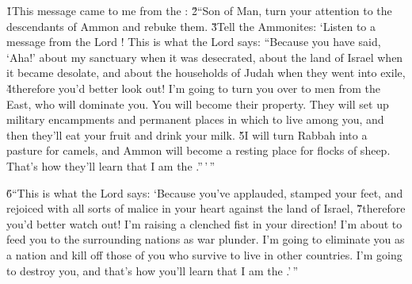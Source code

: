 \v{1}This message came to me from the : \v{2}``Son of Man, turn your attention to the descendants of Ammon and rebuke them. \v{3}Tell the Ammonites: `Listen to a message from the Lord ! This is what the Lord  says: ``Because you have said, `Aha!' about my sanctuary when it was desecrated, about the land of Israel when it became desolate, and about the households of Judah when they went into exile, \v{4}therefore you'd better look out! I'm going to turn you over to men from the East, who will dominate you. You will become their property. They will set up military encampments and permanent places in which to live among you, and then they'll eat your fruit and drink your milk. \v{5}I will turn Rabbah into a pasture for camels, and Ammon will become a resting place for flocks of sheep. That's how they'll learn that I am the .''\,'\,''

\v{6}``This is what the Lord  says: `Because you've applauded, stamped your feet, and rejoiced with all sorts of malice in your heart against the land of Israel, \v{7}therefore you'd better watch out! I'm raising a clenched fist in your direction! I'm about to feed you to the surrounding nations as war plunder. I'm going to eliminate you as a nation and kill off those of you who survive to live in other countries. I'm going to destroy you, and that's how you'll learn that I am the .'\,''

